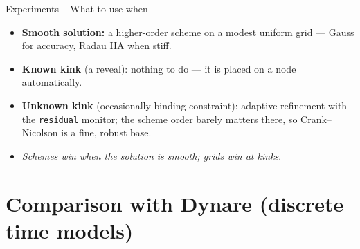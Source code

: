 \documentclass[11pt,aspectratio=169]{beamer}
\begin{document}
\begin{frame}{Experiments -- What to use when}

\begin{itemize}

\item \textbf{Smooth solution:} a higher-order scheme on a modest uniform
  grid — Gauss for accuracy, Radau IIA when stiff.\newline

\item \textbf{Known kink} (a reveal): nothing to do — it is placed on a
  node automatically.\newline

\item \textbf{Unknown kink} (occasionally-binding constraint): adaptive
  refinement with the \texttt{residual} monitor; the scheme order barely
  matters there, so Crank--Nicolson is a fine, robust base.\newline

\item \emph{Schemes win when the solution is smooth; grids
  win at kinks}.

\end{itemize}

\end{frame}

\section{Comparison with Dynare (discrete time models)}
\end{document}
